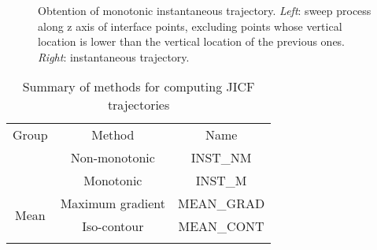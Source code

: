 \begin{figure}[ht]
     \centering
     \begin{subfigure}[b]{0.45\textwidth}
         \centering
     \end{subfigure}
     \begin{subfigure}[b]{0.45\textwidth}
         \centering
     \end{subfigure}
        \caption[Obtention of monotonic instantaneous trajectory]{Obtention of monotonic instantaneous trajectory. \textsl{Left}: sweep process along z axis of interface points, excluding points whose vertical location is lower than the vertical location of the previous ones. \textsl{Right}: instantaneous trajectory.}
        \label{fig:trajectory_obtention_instantaneous_method_b}
\end{figure}







\begin{table}[!h]
\centering
\caption{Summary of methods for computing JICF trajectories}
\begin{tabular}{ccc}
\thickhline
Group & Method & Name \\
\thickhline
\multirow{2}{*}{Instantaneous} & Non-monotonic & INST\_NM \\
 & Monotonic & INST\_M \\
 \hline
\multirow{2}{*}{Mean} & Maximum gradient & MEAN\_GRAD \\
 & Iso-contour & MEAN\_CONT \\
\thickhline
\end{tabular}
\label{tab:jicf_tools_trajectories_obtention}
\end{table}




